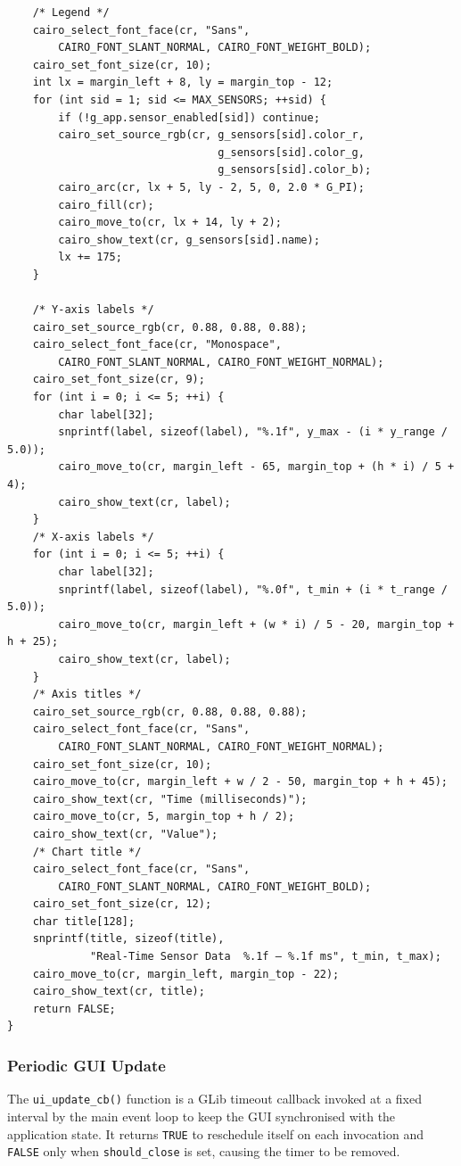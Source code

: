 \begin{verbatim}
    /* Legend */
    cairo_select_font_face(cr, "Sans",
        CAIRO_FONT_SLANT_NORMAL, CAIRO_FONT_WEIGHT_BOLD);
    cairo_set_font_size(cr, 10);
    int lx = margin_left + 8, ly = margin_top - 12;
    for (int sid = 1; sid <= MAX_SENSORS; ++sid) {
        if (!g_app.sensor_enabled[sid]) continue;
        cairo_set_source_rgb(cr, g_sensors[sid].color_r,
                                 g_sensors[sid].color_g,
                                 g_sensors[sid].color_b);
        cairo_arc(cr, lx + 5, ly - 2, 5, 0, 2.0 * G_PI);
        cairo_fill(cr);
        cairo_move_to(cr, lx + 14, ly + 2);
        cairo_show_text(cr, g_sensors[sid].name);
        lx += 175;
    }

    /* Y-axis labels */
    cairo_set_source_rgb(cr, 0.88, 0.88, 0.88);
    cairo_select_font_face(cr, "Monospace",
        CAIRO_FONT_SLANT_NORMAL, CAIRO_FONT_WEIGHT_NORMAL);
    cairo_set_font_size(cr, 9);
    for (int i = 0; i <= 5; ++i) {
        char label[32];
        snprintf(label, sizeof(label), "%.1f", y_max - (i * y_range / 5.0));
        cairo_move_to(cr, margin_left - 65, margin_top + (h * i) / 5 + 4);
        cairo_show_text(cr, label);
    }
    /* X-axis labels */
    for (int i = 0; i <= 5; ++i) {
        char label[32];
        snprintf(label, sizeof(label), "%.0f", t_min + (i * t_range / 5.0));
        cairo_move_to(cr, margin_left + (w * i) / 5 - 20, margin_top + h + 25);
        cairo_show_text(cr, label);
    }
    /* Axis titles */
    cairo_set_source_rgb(cr, 0.88, 0.88, 0.88);
    cairo_select_font_face(cr, "Sans",
        CAIRO_FONT_SLANT_NORMAL, CAIRO_FONT_WEIGHT_NORMAL);
    cairo_set_font_size(cr, 10);
    cairo_move_to(cr, margin_left + w / 2 - 50, margin_top + h + 45);
    cairo_show_text(cr, "Time (milliseconds)");
    cairo_move_to(cr, 5, margin_top + h / 2);
    cairo_show_text(cr, "Value");
    /* Chart title */
    cairo_select_font_face(cr, "Sans",
        CAIRO_FONT_SLANT_NORMAL, CAIRO_FONT_WEIGHT_BOLD);
    cairo_set_font_size(cr, 12);
    char title[128];
    snprintf(title, sizeof(title),
             "Real-Time Sensor Data  %.1f — %.1f ms", t_min, t_max);
    cairo_move_to(cr, margin_left, margin_top - 22);
    cairo_show_text(cr, title);
    return FALSE;
}
\end{verbatim}


\subsubsection{Periodic GUI Update}

The \texttt{ui\_update\_cb()} function is a GLib timeout callback
invoked at a fixed interval by the main event loop to keep the GUI
synchronised with the application state. It returns \texttt{TRUE} to
reschedule itself on each invocation and \texttt{FALSE} only when
\texttt{should\_close} is set, causing the timer to be removed.

